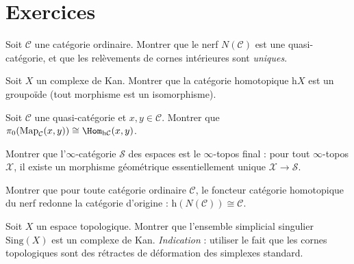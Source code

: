 
\section{Exercices}\label{sec:exo-infty}

\begin{exercice}\label{exo:nerf-quasi-cat}
Soit $\mathcal{C}$ une catégorie ordinaire.  Montrer que le nerf
$N(\mathcal{C})$ est une quasi-catégorie, et que les relèvements
de cornes intérieures sont \emph{uniques}.
\end{exercice}

\begin{exercice}\label{exo:kan-infty-groupoide}
Soit $X$ un complexe de Kan.  Montrer que la catégorie homotopique
$\mathrm{h}X$ est un groupoïde (tout morphisme est un isomorphisme).
\end{exercice}

\begin{exercice}\label{exo:mapping-pi0}
Soit $\mathcal{C}$ une quasi-catégorie et $x, y \in \mathcal{C}$.
Montrer que $\pi_0(\mathrm{Map}_\mathcal{C}(x,y)) \cong
\Hom_{\mathrm{h}\mathcal{C}}(x, y)$.
\end{exercice}

\begin{exercice}\label{exo:infty-topos-S}
Montrer que l'$\infty$-catégorie $\mathcal{S}$ des espaces est le
$\infty$-topos final : pour tout $\infty$-topos $\mathcal{X}$, il
existe un morphisme géométrique essentiellement unique
$\mathcal{X} \to \mathcal{S}$.
\end{exercice}

\begin{exercice}\label{exo:nerf-h}
Montrer que pour toute catégorie ordinaire $\mathcal{C}$,
le foncteur catégorie homotopique du nerf redonne la catégorie
d'origine : $\mathrm{h}(N(\mathcal{C})) \cong \mathcal{C}$.
\end{exercice}

\begin{exercice}\label{exo:sing-kan}
Soit $X$ un espace topologique.  Montrer que l'ensemble simplicial
singulier $\mathrm{Sing}(X)$ est un complexe de Kan.
\textit{Indication} : utiliser le fait que les cornes topologiques
sont des rétractes de déformation des simplexes standard.
\end{exercice}

